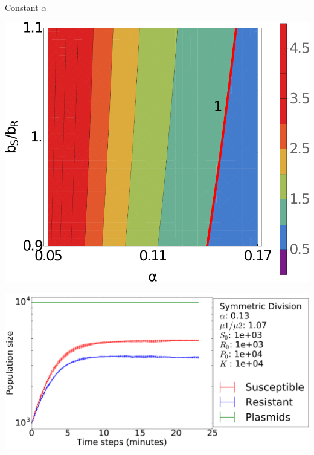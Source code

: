 \documentclass[final]{beamer}
\newlength{\sepwid}
\newlength{\onecolwid}
\newlength{\figwid}
\begin{document}
\begin{frame}[t]
\begin{block}
\begin{columns}[t]

\begin{column}{\onecolwid}

  \begin{block}{Constant $\alpha$}
  \begin{center}
    \includegraphics[width=\figwid]{../dev/graphics/poster/const_contour.pdf}

    \includegraphics[width=\figwid]{../dev/graphics/poster/const_pop.pdf}
  \end{center}


\end{block}
\end{column}
\end{columns}
\end{block}
\end{frame}
\end{document}
